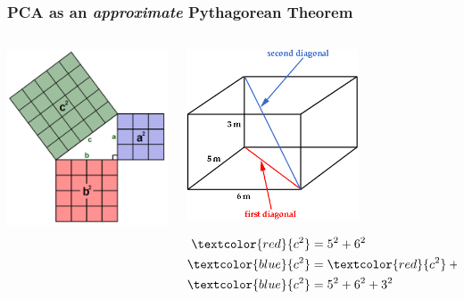 \documentclass[xcolor={dvipsnames}]{beamer}
\begin{document}
\frame
{
 \frametitle{PCA as an \emph{approximate} Pythagorean Theorem}

\begin{columns}
\begin{column}{.5\textwidth}
\includegraphics[width=2in]{stuff/pythag2d.png}
\end{column}

\begin{column}{.5\textwidth}
\includegraphics[width=2in]{stuff/pythag3d.jpg}

\begin{align*} %
\textcolor{red}{c^2} = {}& 5^2 + 6^2\\
\textcolor{blue}{c^2} = {}& \textcolor{red}{c^2} + 3^2\\
\textcolor{blue}{c^2} = {}& 5^2 + 6^2 + 3^2
\end{align*}

\end{column}

\end{columns}



 }
\end{document}
